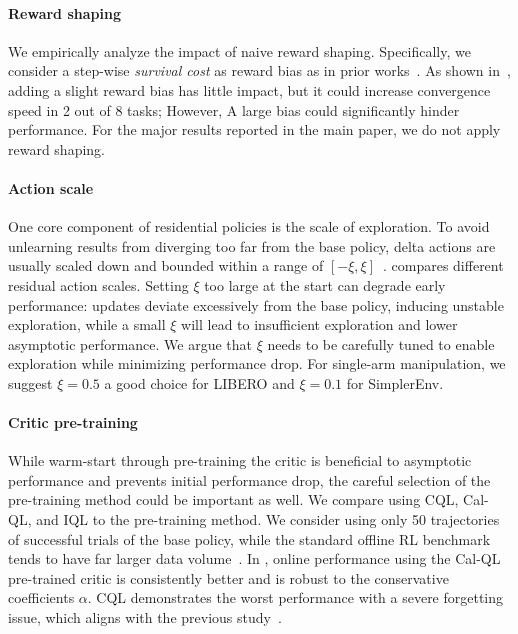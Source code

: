 \label{subsec: appendix-real}



\paragraph{Reward shaping}
We empirically analyze the impact of naive reward shaping. Specifically, we consider a step-wise \emph{survival cost} as reward bias as in prior works~\cite{luo2024serl}. As shown in~, adding a slight reward bias has little impact, but it could increase convergence speed in 2 out of 8 tasks; However, A large bias could significantly hinder performance. For the major results reported in the main paper, we do not apply reward shaping. 




\paragraph{Action scale}
One core component of residential policies is the scale of exploration. To avoid unlearning results from diverging too far from the base policy, delta actions are usually scaled down and bounded within a range of \([-\xi, \xi]\)~\citep{ankile2025imitation, dong2025expo}.  compares different residual action scales. Setting \(\xi\) too large at the start can degrade early performance: updates deviate excessively from the base policy, inducing unstable exploration, while a small \(\xi\) will lead to insufficient exploration and lower asymptotic performance. We argue that \(\xi\) needs to be carefully tuned to enable exploration while minimizing performance drop. For single-arm manipulation, we suggest \(\xi=0.5\) a good choice for LIBERO and \(\xi=0.1\) for SimplerEnv.


\paragraph{Critic pre-training}
While warm-start through pre-training the critic is beneficial to asymptotic performance and prevents initial performance drop, the careful selection of the pre-training method could be important as well. We compare using CQL, Cal-QL, and IQL to the pre-training method. We consider using only 50 trajectories of successful trials of the base policy, while the standard offline RL benchmark tends to have far larger data volume~\citep{fu2020d4rl}. In , online performance using the Cal-QL pre-trained critic is consistently better and is robust to the conservative coefficients \(\alpha\). CQL demonstrates the worst performance with a severe forgetting issue, which aligns with the previous study~\citep{cal-QL}.

